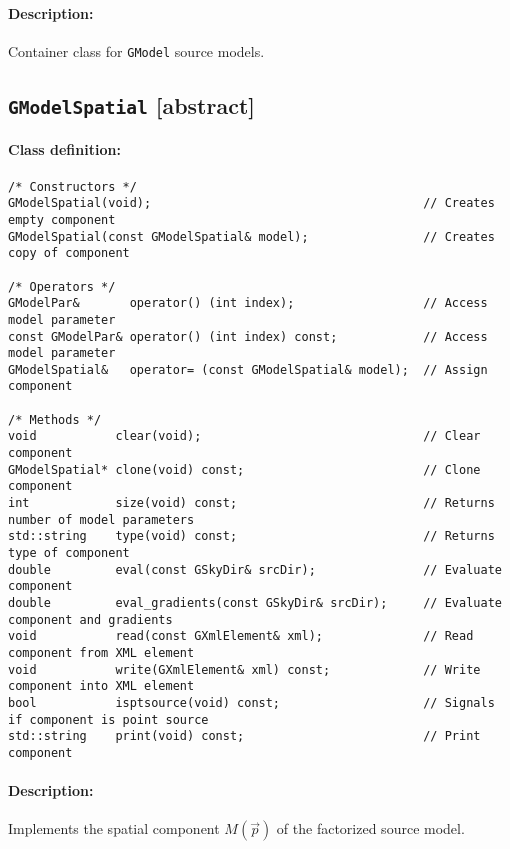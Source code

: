 \documentclass{article}[12pt,a4]
\begin{document}
\paragraph{Description:}
Container class for {\tt GModel} source models.


\newpage
\subsection{{\tt GModelSpatial} \small[abstract]}

\paragraph{Class definition:}
\begin{verbatim}
/* Constructors */
GModelSpatial(void);                                      // Creates empty component
GModelSpatial(const GModelSpatial& model);                // Creates copy of component

/* Operators */
GModelPar&       operator() (int index);                  // Access model parameter
const GModelPar& operator() (int index) const;            // Access model parameter
GModelSpatial&   operator= (const GModelSpatial& model);  // Assign component

/* Methods */
void           clear(void);                               // Clear component
GModelSpatial* clone(void) const;                         // Clone component
int            size(void) const;                          // Returns number of model parameters
std::string    type(void) const;                          // Returns type of component
double         eval(const GSkyDir& srcDir);               // Evaluate component
double         eval_gradients(const GSkyDir& srcDir);     // Evaluate component and gradients
void           read(const GXmlElement& xml);              // Read component from XML element
void           write(GXmlElement& xml) const;             // Write component into XML element
bool           isptsource(void) const;                    // Signals if component is point source
std::string    print(void) const;                         // Print component
\end{verbatim}

\paragraph{Description:}
Implements the spatial component $M(\vec{p})$ of the factorized source model.
\end{document}
